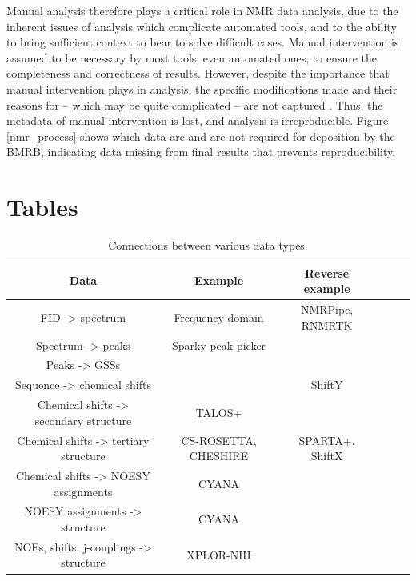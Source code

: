 Manual analysis therefore plays a critical role in NMR data analysis, due 
to the inherent issues of analysis which complicate automated tools, and 
to the ability to bring sufficient context to bear to solve difficult cases.  
Manual intervention is assumed to be necessary by 
most tools, even automated ones, to ensure the completeness and correctness 
of results.  However, despite the importance that manual intervention plays 
in analysis, the specific modifications made and their reasons for -- 
which may be quite complicated -- are not captured \cite{guntert2009automated}.  
Thus, the metadata of manual intervention is lost, and analysis is 
irreproducible.
Figure \ref{nmr_process} shows which data are and are not required for 
deposition by the BMRB, indicating data missing from final results that
prevents reproducibility.



\clearpage
\section{Tables}

\begin{table}[h]
    \begin{tabular}{ | c || c | c | c | c | c |}
    \hline
      Data                                      &  Example              &  Reverse example   \\  \hline
      FID -> spectrum                           &  Frequency-domain     &  NMRPipe, RNMRTK   \\  \hline
      Spectrum -> peaks                         &  Sparky peak picker   &                    \\  \hline
      Peaks -> GSSs                             &                       &                    \\  \hline
      Sequence -> chemical shifts               &                       &  ShiftY            \\  \hline
      Chemical shifts -> secondary structure    &  TALOS+               &                    \\  \hline
      Chemical shifts -> tertiary structure     &  CS-ROSETTA, CHESHIRE &  SPARTA+, ShiftX   \\  \hline
      Chemical shifts -> NOESY assignments      &  CYANA                &                    \\  \hline
      NOESY assignments -> structure            &  CYANA                &                    \\  \hline
      NOEs, shifts, j-couplings -> structure    &  XPLOR-NIH            &                    \\  \hline
    \end{tabular}
    \caption{Connections between various data types.}
    \label{data_connections}
\end{table}



